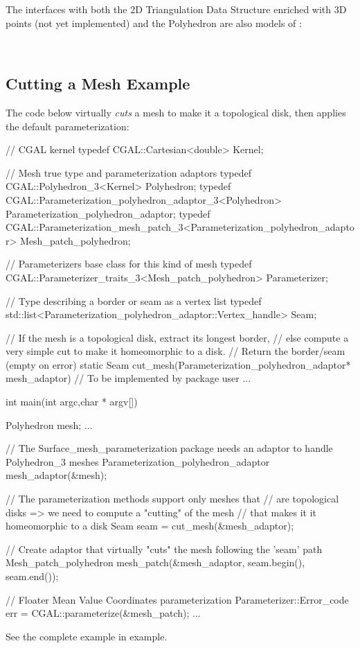 The  interfaces with both the 2D
Triangulation Data Structure enriched with 3D points (not yet
implemented) and the Polyhedron are also models of
:

  \\


\subsection{Cutting a Mesh Example}

The code below virtually {\em cuts} a  mesh to make
it a topological disk, then applies the default parameterization:

\begin{ccExampleCode}

// CGAL kernel
typedef CGAL::Cartesian<double>                             Kernel;

// Mesh true type and parameterization adaptors
typedef CGAL::Polyhedron_3<Kernel>                          Polyhedron;
typedef CGAL::Parameterization_polyhedron_adaptor_3<Polyhedron>
                                                            Parameterization_polyhedron_adaptor;
typedef CGAL::Parameterization_mesh_patch_3<Parameterization_polyhedron_adaptor>
                                                            Mesh_patch_polyhedron;

// Parameterizers base class for this kind of mesh
typedef CGAL::Parameterizer_traits_3<Mesh_patch_polyhedron> Parameterizer;

// Type describing a border or seam as a vertex list
typedef std::list<Parameterization_polyhedron_adaptor::Vertex_handle>
                                                            Seam;

// If the mesh is a topological disk, extract its longest border,
// else compute a very simple cut to make it homeomorphic to a disk.
// Return the border/seam (empty on error)
static Seam cut_mesh(Parameterization_polyhedron_adaptor* mesh_adaptor)
{
    // To be implemented by package user
    ...
}

int main(int argc,char * argv[])
{
    Polyhedron mesh;
    ...

    // The Surface_mesh_parameterization package needs an adaptor to handle Polyhedron_3 meshes
    Parameterization_polyhedron_adaptor mesh_adaptor(&mesh);

    // The parameterization methods support only meshes that
    // are topological disks => we need to compute a "cutting" of the mesh
    // that makes it it homeomorphic to a disk
    Seam seam = cut_mesh(&mesh_adaptor);

    // Create adaptor that virtually "cuts" the mesh following the 'seam' path
    Mesh_patch_polyhedron   mesh_patch(&mesh_adaptor,
                                       seam.begin(),
                                       seam.end());

    // Floater Mean Value Coordinates parameterization
    Parameterizer::Error_code err = CGAL::parameterize(&mesh_patch);
    ...
}

\end{ccExampleCode}

See the complete example in 
example.


